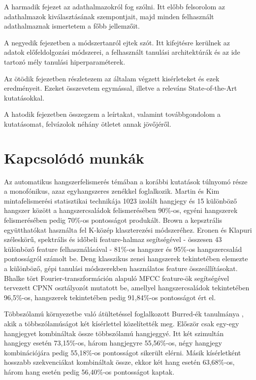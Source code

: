 A harmadik fejezet az adathalmazokról fog szólni. Itt előbb felsorolom az adathalmazok kiválasztásának szempontjait, majd minden felhasznált adathalmaznak ismertetem a főbb jellemzőit. 

A negyedik fejezetben a módszertanról ejtek szót. Itt kifejtésre kerülnek az adatok előfeldolgozási módszerei, a felhasznált tanulási architektúrák és az ide tartozó mély tanulási hiperparaméterek.

Az ötödik fejezetben részletezem az általam végzett kisérleteket és ezek eredményeit. Ezeket összevetem egymással, illetve a releváns State-of-the-Art kutatásokkal.

A hatodik fejezetben összegzem a leírtakat, valamint továbbgondolom a kutatásomat, felvázolok néhány ötletet annak jövőjéről.


\section{Kapcsolódó munkák}

Az automatikus hangszerfelismerés témában a korábbi kutatások túlnyomó része a monofónikus, azaz egyhangszeres zenékkel foglalkozik. Martin és Kim \cite{Martin1998} mintafelismerési statisztikai technikája 1023 izolált hangjegy és 15 különböző hangszer között a hangszercsaládok felismerésében 90\%-os, egyéni hangszerek felismerésében pedig 70\%-os pontosságot produkált. Brown \cite{brown1999} a kepsztrális együtthatókat használta fel K-közép klaszterezési módszeréhez. Eronen és Klapuri \cite{eronenklapuri2000} széleskörű, spektrális és időbeli feature-halmaz segítségével - összesen 43 különböző feature felhasználásával - 81\%-os hangszer és 95\%-os hangszercsalád pontosságról számolt be. Deng \cite{deng2008} klasszikus zenei hangszerek tekintetében elemezte a különböző, gépi tanulási módszerekben használatos feature összeállításokat. Bhalke \cite{bhalke2015} tört Fourier-transzformáción alapuló MFCC feature-ök segítségével tervezett CPNN osztályozót mutatott be, amellyel hangszercsaládok tekintetében 96,5\%-os, hangszerek tekintetében pedig 91,84\%-os pontosságot ért el.

Többszólamú környezetbe való átültetéssel foglalkozott Burred-ék tanulmánya \cite{burred2010}, akik a többszólamúságot két kísérlettel közelítették meg. Először csak egy-egy hangjegyet kombináltak össze többszólamú hangjeggyé. Itt két szimultán hangjegy esetén 73,15\%-os, három hangjegyre 55,56\%-os, négy hangjegy kombinációjára pedig 55,18\%-os pontosságot sikerült elérni. Másik kísérletként hosszabb szekvenciákat kombináltak össze, ekkor két hang esetén 63,68\%-os, három hang esetén pedig 56,40\%-os pontosságot kaptak. 

